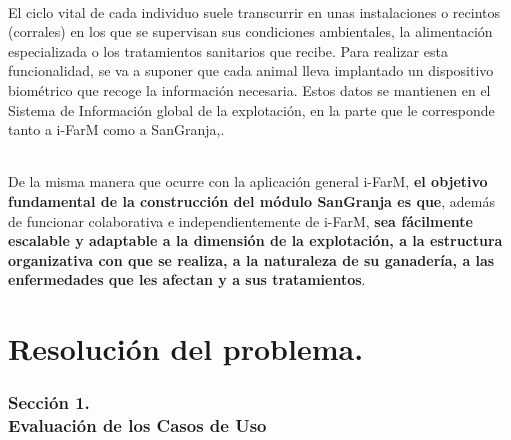 \documentclass[a4paper]{article}
\begin{document}
\paragraph{}El ciclo vital de cada individuo suele transcurrir en unas instalaciones o recintos ({\large corrales}) en los que se supervisan sus condiciones ambientales, la alimentación especializada o los tratamientos sanitarios que recibe. Para realizar esta funcionalidad, se va a suponer que cada animal lleva implantado un dispositivo biométrico que recoge la información necesaria. Estos datos se mantienen en el {\large Sistema de Información} global de la explotación, en la parte que le corresponde tanto a {\large i-FarM} como a {\large SanGranja},.

\paragraph{}De la misma manera que ocurre con la aplicación general {\large i-FarM},\textbf{ el objetivo fundamental de la construcción del módulo SanGranja es que}, además de funcionar colaborativa e independientemente de {\large i-FarM}, \textbf{sea fácilmente escalable y adaptable a la dimensión de la explotación, a la estructura organizativa con que se realiza, a la naturaleza de su ganadería, a las enfermedades que les afectan y a sus tratamientos}.
\paragraph{}




\newpage
\part{Resolución del problema.}
\section{Sección 1.\\Evaluación de los Casos de Uso}
\end{document}
